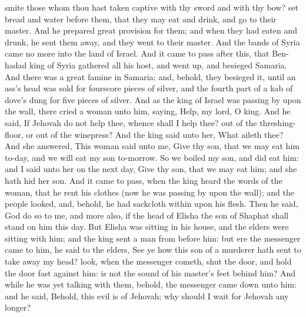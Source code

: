 smite those whom thou hast taken captive with thy sword and with thy bow? set bread and water before them, that they may eat and drink, and go to their master. And he prepared great provision for them; and when they had eaten and drunk, he sent them away, and they went to their master. And the bands of Syria came no more into the land of Israel.  And it came to pass after this, that Ben-hadad king of Syria gathered all his host, and went up, and besieged Samaria. And there was a great famine in Samaria: and, behold, they besieged it, until an ass’s head was sold for fourscore pieces of silver, and the fourth part of a kab of dove’s dung for five pieces of silver. And as the king of Israel was passing by upon the wall, there cried a woman unto him, saying, Help, my lord, O king. And he said, If Jehovah do not help thee, whence shall I help thee? out of the threshing-floor, or out of the winepress? And the king said unto her, What aileth thee? And she answered, This woman said unto me, Give thy son, that we may eat him to-day, and we will eat my son to-morrow. So we boiled my son, and did eat him: and I said unto her on the next day, Give thy son, that we may eat him; and she hath hid her son. And it came to pass, when the king heard the words of the woman, that he rent his clothes (now he was passing by upon the wall); and the people looked, and, behold, he had sackcloth within upon his flesh. Then he said, God do so to me, and more also, if the head of Elisha the son of Shaphat shall stand on him this day.  But Elisha was sitting in his house, and the elders were sitting with him; and the king sent a man from before him: but ere the messenger came to him, he said to the elders, See ye how this son of a murderer hath sent to take away my head? look, when the messenger cometh, shut the door, and hold the door fast against him: is not the sound of his master’s feet behind him? And while he was yet talking with them, behold, the messenger came down unto him: and he said, Behold, this evil is of Jehovah; why should I wait for Jehovah any longer? 

